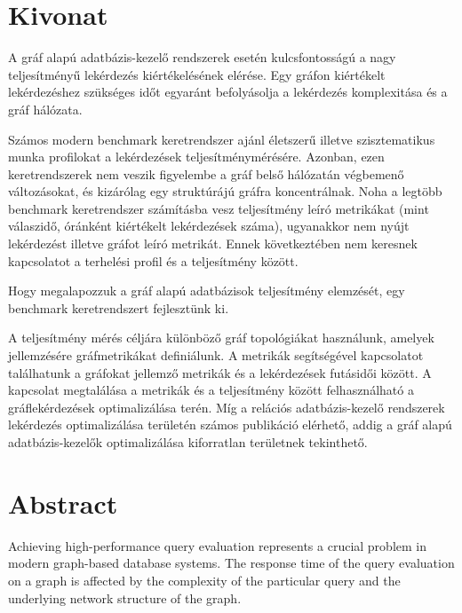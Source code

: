\setcounter{page}{1}


\englishParagraph
\chapter*{Kivonat}


A gráf alapú adatbázis-kezelő rendszerek esetén kulcsfontosságú a nagy teljesítményű lekérdezés kiértékelésének elérése. Egy gráfon kiértékelt lekérdezéshez szükséges időt egyaránt befolyásolja a lekérdezés komplexitása és a gráf hálózata. 

Számos modern benchmark keretrendszer ajánl életszerű illetve szisztematikus munka profilokat a lekérdezések teljesítménymérésére.
Azonban, ezen keretrendszerek nem veszik figyelembe a gráf belső hálózatán végbemenő változásokat, és kizárólag egy struktúrájú gráfra koncentrálnak. Noha a legtöbb benchmark keretrendszer számításba vesz teljesítmény leíró metrikákat (mint válaszidő, óránként kiértékelt lekérdezések száma), ugyanakkor nem nyújt lekérdezést illetve gráfot leíró metrikát. Ennek következtében nem keresnek kapcsolatot a terhelési profil és a teljesítmény között.

Hogy megalapozzuk a gráf alapú adatbázisok teljesítmény elemzését, egy benchmark keretrendszert fejlesztünk ki.

A teljesítmény mérés céljára különböző gráf topológiákat használunk, amelyek jellemzésére gráfmetrikákat definiálunk. A metrikák segítségével kapcsolatot találhatunk a gráfokat jellemző metrikák és a lekérdezések futásidői között. A kapcsolat megtalálása a metrikák és a teljesítmény között felhasználható a gráflekérdezések optimalizálása terén. Míg a relációs adatbázis-kezelő rendszerek lekérdezés optimalizálása területén számos publikáció elérhető, addig a gráf alapú adatbázis-kezelők optimalizálása kiforratlan területnek tekinthető.



\vfill
{}
\englishParagraph


\chapter*{Abstract}
Achieving high-performance query evaluation represents a crucial problem in modern graph-based database systems. The response time of the query evaluation on a graph is affected by the complexity of the particular query and the underlying network structure of the graph. 

